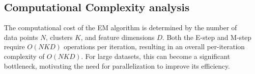 \subsection{Computational Complexity analysis}
\label{sec:complexity_analysis}
The computational cost of the EM algorithm is determined by the number of data points $N$, clusters $K$, and feature dimensions $D$.  
Both the E-step and M-step require $O(NKD)$ operations per iteration, resulting in an overall per-iteration complexity of $O(NKD)$.  
For large datasets, this can become a significant bottleneck, motivating the need for parallelization to improve its efficiency.